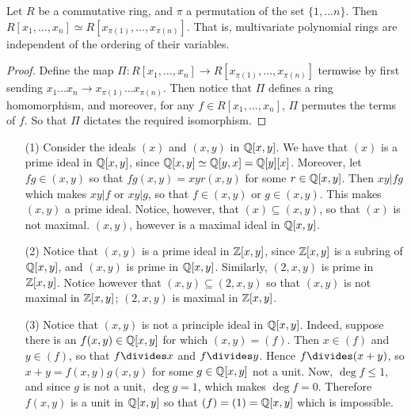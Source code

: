 \begin{proposition}\label{proposition_7.1.3}
  Let $R$ be a commutative ring, and  $\pi$ a permutation of the set  $\{1,
  \dots n\}$. Then $R[x_1, \dots, x_n] \simeq R[x_{\pi(1)}, \dots,
  x_{\pi(n)}]$. That is, multivariate polynomial rings are independent of the
  ordering of their variables.
\end{proposition}
\begin{proof}
  Define the map $\Pi:R[x_1, \dots, x_n] \xrightarrow{} R[x_{\pi(1)}, \dots,
  x_{\pi(n)}]$ termwise by first sending $x_1 \dots x_n \xrightarrow{}
  x_{\pi(1)} \dots x_{\pi(n)}$. Then notice that $\Pi$ defines a ring
  homomorphism, and moreover, for any  $f \in R[x_1, \dots, x_n]$, $\Pi$
  permutes the terms of $f$. So that  $\Pi$ dictates the required isomorphism.
\end{proof}

\begin{example}\label{label_7.3}
\begin{enumerate}
\item[(1)] Consider the ideals $(x)$ and $(x,y)$ in $\mathbb{Q}[x,y]$. We have
that $(x)$ is a prime ideal in $\mathbb{Q}[x,y]$, since $\mathbb{Q}[x,y] \simeq
\mathbb{Q}[y,x]=\mathbb{Q}[y][x]$. Moreover, let $fg \in (x,y)$ so that
$fg(x,y)=xyr(x,y)$ for some $r \in \mathbb{Q}[x,y]$. Then $xy|fg$ which
makes  $xy|f$ or  $xy|g$, so that $f \in (x,y)$ or $g \in (x,y)$.
This makes $(x,y)$ a prime ideal. Notice, however, that $(x)
\subseteq (x,y)$, so that $(x)$ is not maximal. $(x,y)$, however is
a maximal ideal in $\mathbb{Q}[x,y]$.

\item[(2)] Notice that $(x,y)$ is a prime ideal in $\mathbb{Z}[x,y]$, since
$\mathbb{Z}[x,y]$ is a subring of $\mathbb{Q}[x,y]$, and $(x,y)$ is prime in
$\mathbb{Q}[x,y]$. Similarly, $(2,x,y)$ is prime in $\mathbb{Z}[x,y]$. Notice
however that $(x,y) \subseteq (2,x,y)$ so that $(x,y)$ is not
maximal in $\mathbb{Z}[x,y]$; $(2,x,y)$ is maximal in $\mathbb{Z}[x,y]$.

\item[(3)] Notice that $(x,y)$ is not a principle ideal in $\mathbb{Q}[x,y]$.
  Indeed, suppose there is an $f(x,y) \in \mathbb{Q}[x,y]$ for which
  $(x,y)=(f)$. Then $x \in (f)$ and $y \in (f)$, so that $f \divides
  x$ and  $f \divides y$. Hence $f \divides (x+y)$, so
  $x+y=f(x,y)g(x,y)$ for some $g \in \mathbb{Q}[x,y]$ not a unit. Now,
  $\deg{f} \leq 1$, and since $g$ is not a unit, $\deg{g}=1$, which
  makes $\deg{f}=0$. Therefore $f(x,y)$ is a unit in $\mathbb{Q}[x,y]$ so that
  $(f)=(1)=\mathbb{Q}[x,y]$ which is impossible.
\end{enumerate}
\end{example}

